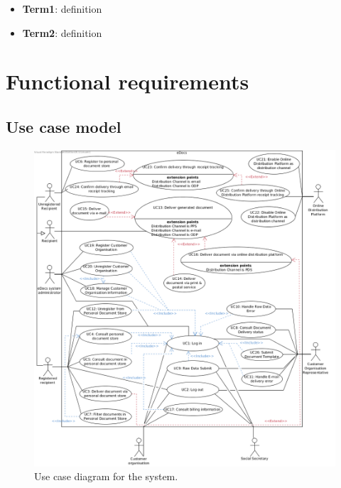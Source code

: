 \documentclass[a4paper,10pt]{article}
\begin{document}
\begin{itemize}
    \item \textbf{Term1}: definition
    \item \textbf{Term2}: definition
\end{itemize}

\section{Functional requirements}\label{sec:functional}
\subsection*{Use case model}

\begin{figure}[!htp]
    \centering
    \includegraphics[width=\textwidth]{Use_case_diagram.png}
    \caption{Use case diagram for the system.}\label{fig:use_case_model}
\end{figure}
\end{document}
